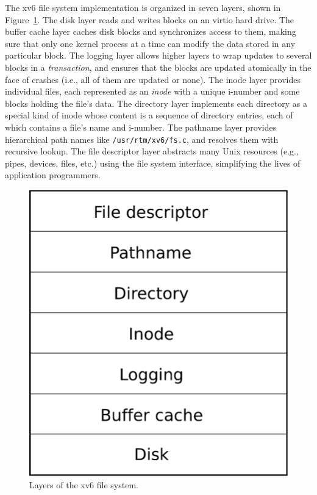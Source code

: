 The xv6 file system implementation is
organized in seven layers, shown in 
Figure~\ref{fig:fslayer}.
The disk layer reads and writes blocks on an virtio hard drive.
The buffer cache layer caches disk blocks and synchronizes access to them,
making sure that only one kernel process at a time can modify the
data stored in any particular block.  The logging layer allows higher
layers to wrap updates to several blocks in a
\textit{transaction},
and ensures that the blocks are updated atomically in the
face of crashes (i.e., all of them are updated or none).
The inode layer provides individual files, each represented as an
\textit{inode}
with a unique i-number
and some blocks holding the file's data.  The directory
layer implements each directory as a special kind of
inode whose content is a sequence of directory entries, each of which contains a
file's name and i-number.
The pathname layer provides
hierarchical path names like
\lstinline{/usr/rtm/xv6/fs.c},
and resolves them with recursive lookup.
The file descriptor layer abstracts many Unix resources (e.g., pipes, devices,
files, etc.) using the file system interface, simplifying the lives of
application programmers.

\begin{figure}[t]
\center
\includegraphics[scale=0.5]{fig/fslayer.eps}
\caption{Layers of the xv6 file system.}
\label{fig:fslayer}
\end{figure}

